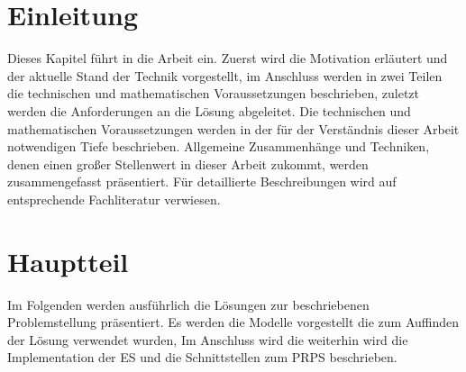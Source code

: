 \documentclass[a4paper,12pt,fleqn]{scrbook}
\begin{document}
\frontmatter 

\setlength{\headheight}{36pt}



\tableofcontents 
%

%


\mainmatter 
\chapter{Einleitung}
Dieses Kapitel führt in die Arbeit ein. Zuerst wird die Motivation erläutert und der aktuelle Stand der Technik vorgestellt, im Anschluss werden in zwei Teilen die technischen und mathematischen Voraussetzungen beschrieben, zuletzt werden die Anforderungen an die Lösung abgeleitet. Die technischen und mathematischen Voraussetzungen werden in der für der Verständnis dieser Arbeit notwendigen Tiefe beschrieben. Allgemeine Zusammenhänge und Techniken, denen einen großer Stellenwert in dieser Arbeit zukommt, werden zusammengefasst präsentiert. Für detaillierte Beschreibungen wird auf entsprechende Fachliteratur verwiesen.
%

%
\chapter{Hauptteil}
Im Folgenden werden ausführlich die Lösungen zur beschriebenen Problemstellung präsentiert. Es werden die Modelle vorgestellt die zum Auffinden der Lösung verwendet wurden, Im Anschluss wird die weiterhin wird die Implementation der ES und die Schnittstellen zum PRPS beschrieben.
%

%
\end{document}
